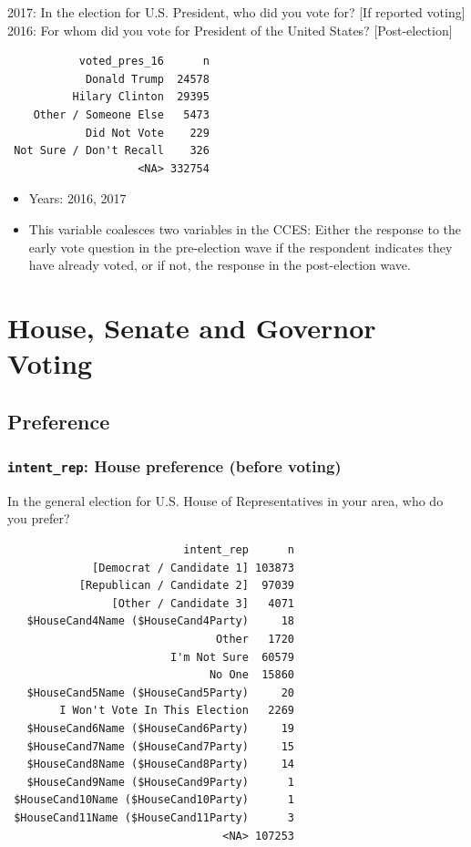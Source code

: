 \documentclass[10pt,article,oneside]{memoir}
\theoremstyle{definition}
\begin{document}
2017: In the election for U.S. President, who did you vote for? {[}If
reported voting{]} 2016: For whom did you vote for President of the
United States? {[}Post-election{]}

\begin{verbatim}
           voted_pres_16      n
            Donald Trump  24578
          Hilary Clinton  29395
    Other / Someone Else   5473
            Did Not Vote    229
 Not Sure / Don't Recall    326
                    <NA> 332754
\end{verbatim}

\begin{itemize}
\tightlist
\item
  Years: 2016, 2017
\item
  This variable coalesces two variables in the CCES: Either the response
  to the early vote question in the pre-election wave if the respondent
  indicates they have already voted, or if not, the response in the
  post-election wave.
\end{itemize}

\section{House, Senate and Governor
Voting}\label{house-senate-and-governor-voting}

\subsection{Preference}\label{preference}

\subsubsection{\texorpdfstring{\texttt{intent\_rep}: House preference
(before
voting)}{intent\_rep: House preference (before voting)}}\label{intent_rep-house-preference-before-voting}

In the general election for U.S. House of Representatives in your area,
who do you prefer?

\begin{verbatim}
                           intent_rep      n
             [Democrat / Candidate 1] 103873
           [Republican / Candidate 2]  97039
                [Other / Candidate 3]   4071
   $HouseCand4Name ($HouseCand4Party)     18
                                Other   1720
                         I'm Not Sure  60579
                               No One  15860
   $HouseCand5Name ($HouseCand5Party)     20
        I Won't Vote In This Election   2269
   $HouseCand6Name ($HouseCand6Party)     19
   $HouseCand7Name ($HouseCand7Party)     15
   $HouseCand8Name ($HouseCand8Party)     14
   $HouseCand9Name ($HouseCand9Party)      1
 $HouseCand10Name ($HouseCand10Party)      1
 $HouseCand11Name ($HouseCand11Party)      3
                                 <NA> 107253
\end{verbatim}
\end{document}
